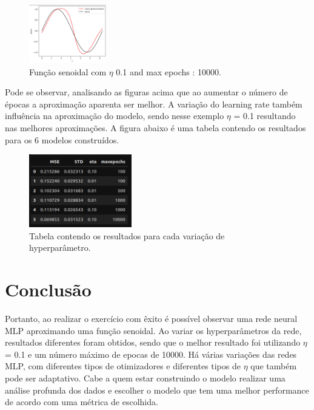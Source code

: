 \documentclass{article}
\begin{document}
\vspace{10pt}

\begin{figure}[h]

    \centering
    \includegraphics[height=1in]{sinc_ap6.png}
    \caption{Função senoidal com $\eta$ 0.1 and max epochs : 10000.}
    \label{fig:example}
    
\end{figure}

\vspace{10pt}

Pode se observar, analisando as figuras acima que ao aumentar o número de épocas a aproximação aparenta ser melhor. A variação do learning rate também influência na aproximação do modelo, sendo nesse exemplo $\eta$ = 0.1 resultando nas melhores aproximações. A figura abaixo é uma tabela contendo os resultados para os 6 modelos construídos.

\vspace{10pt}

\begin{figure}[h]

    \centering
    \includegraphics[height=1.25in]{table_result.png}
    \caption{Tabela contendo os resultados para cada variação de hyperparâmetro.}
    \label{fig:example}
    
\end{figure}

\vspace{10pt}

\newpage

\section{Conclusão}

\vspace{10pt}

Portanto, ao realizar o exercício com êxito é possível observar uma rede neural MLP aproximando uma função senoidal. Ao variar os hyperparâmetros da rede, resultados diferentes foram obtidos, sendo que o melhor resultado foi utilizando $\eta$ = 0.1 e um número máximo de epocas de 10000. Há várias variações das redes MLP, com diferentes tipos de otimizadores e diferentes tipos de $\eta$ que também pode ser adaptativo. Cabe a quem estar construindo o modelo realizar uma análise profunda dos dados e escolher o modelo que tem uma melhor performance de acordo com uma métrica de escolhida.
\end{document}
